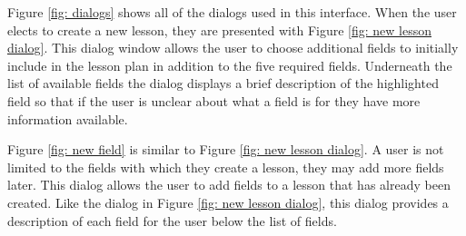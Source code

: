 \documentclass[10pt,letter,titlepage]{article}
\begin{document}
Figure \ref{fig: dialogs} shows all of the dialogs used in this interface. When
the user elects to create a new lesson, they are presented with Figure
\ref{fig: new lesson dialog}. This dialog window allows the user to choose
additional fields to initially include in the lesson plan in addition to the
five required fields. Underneath the list of available fields the dialog
displays a brief description of the highlighted field so that if the user is
unclear about what a field is for they have more information available.

Figure \ref{fig: new field} is similar to Figure \ref{fig: new lesson dialog}. A
user is not limited to the fields with which they create a lesson, they may add
more fields later. This dialog allows the user to add fields to a lesson that
has already been created. Like the dialog in Figure \ref{fig: new lesson dialog},
this dialog provides a description of each field for the user below the list of
fields.
\end{document}
